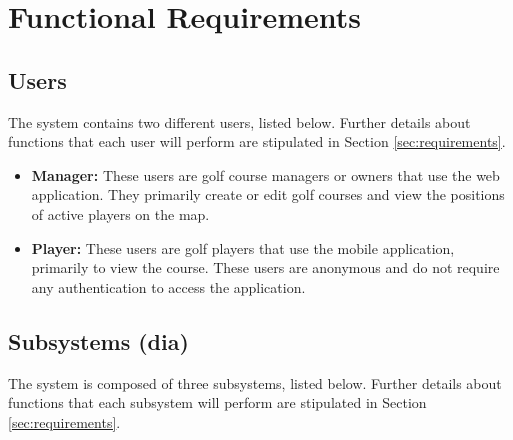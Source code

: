 \documentclass{article}
\begin{document}
    \newpage


    \section{Functional Requirements} 

    \subsection{Users}

    The system contains two different users, listed below. Further details
    about functions that each user will perform are stipulated in Section
    \ref{sec:requirements}.

    \begin{itemize}
        \item \textbf{Manager:} These users are golf course managers or owners
            that use the web application. They primarily create or edit golf
            courses and view the positions of active players on the map.
        \item \textbf{Player:} These users are golf players that use the mobile
            application, primarily to view the course. These users are
            anonymous and do not require any authentication to access the
            application.
    \end{itemize}

    \subsection{Subsystems (dia)}

    The system is composed of three subsystems, listed below. Further details
    about functions that each subsystem will perform are stipulated in Section
    \ref{sec:requirements}.
\end{document}
